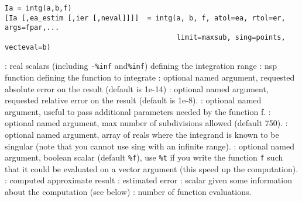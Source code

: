 
\begin{mandesc}
\end{mandesc}

\begin{calling_sequence}
\begin{verbatim}
Ia = intg(a,b,f)
[Ia [,ea_estim [,ier [,neval]]]]  = intg(a, b, f, atol=ea, rtol=er, args=fpar,... 
                                         limit=maxsub, sing=points, vecteval=b)
\end{verbatim}
\end{calling_sequence}
\begin{parameters}
  \begin{varlist}
    :  real scalars (including \verb+-%inf+ and\verb+%inf+) defining the integration range
    : nsp function defining the function to integrate
    : optional named argument, requested absolute error
                      on the result (default is 1e-14)
    : optional named argument, requested relative error
                      on the result (default is 1e-8).
    : optional named argument, useful to pass
    additional parameters needed by the function f.
    : optional named argument, max number of
    subdivisions allowed (default 750).
    : optional named argument, array of reals where the integrand
    is known to be singular (note that you cannot use sing with an infinite range).
    : optional named argument, boolean scalar
    (default \verb+%f+), use \verb+%t+ if you write the function
                   \verb+f+ such that it could be evaluated on a
                   vector argument (this speed up the computation).
    : computed approximate result
    : estimated error
    : scalar given some information about the computation (see below)
    : number of function evaluations.
  \end{varlist}
\end{parameters}

